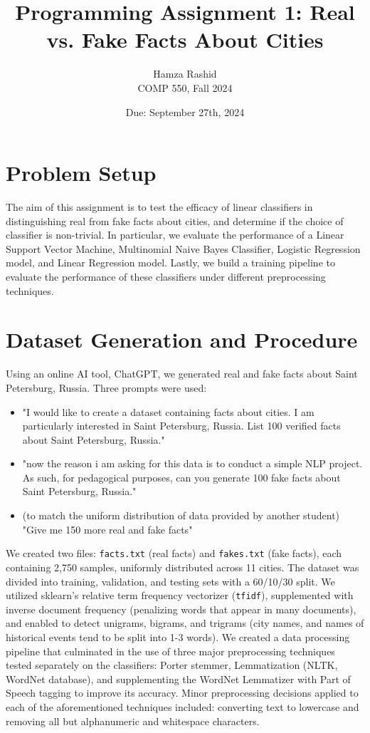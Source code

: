 \documentclass[11pt]{article}
\title{Programming Assignment 1: Real vs. Fake Facts About Cities}
\author{Hamza Rashid \\
COMP 550, Fall 2024}
\date{Due: September 27th, 2024}
\begin{document}
\maketitle

\section{Problem Setup}
The aim of this assignment is to test the efficacy of linear classifiers
in distinguishing real from fake facts about cities, and determine if the choice
of classifier is non-trivial. In particular, we evaluate the performance 
of a Linear Support Vector Machine, Multinomial Naive Bayes Classifier, 
Logistic Regression model, and Linear Regression model. Lastly, we build a training pipeline
to evaluate the performance of these classifiers under different preprocessing 
techniques.


\section{Dataset Generation and Procedure}
Using an online AI tool, ChatGPT, we generated real and fake facts about Saint Petersburg, Russia. Three prompts were used:
\begin{itemize}
    \item "I would like to create a dataset containing facts about cities. 
    I am particularly interested in Saint Petersburg, Russia.
    List 100 verified facts about Saint Petersburg, Russia."
    \item "now the reason i am asking for this data is to conduct a simple NLP project. 
    As such, for pedagogical purposes, can you generate 100 fake facts about Saint Petersburg, Russia."
    \item (to match the uniform distribution of data provided by another student) "Give me 150 more real and fake facts"
\end{itemize}
We created two files: \texttt{facts.txt} (real facts) 
and \texttt{fakes.txt} (fake facts), each containing 2,750 samples, 
uniformly distributed across 11 cities. The dataset was divided into 
training, validation, and testing sets
with a 60/10/30 split. We utilized sklearn's relative term frequency
vectorizer (\texttt{tfidf}), supplemented with inverse document frequency 
(penalizing words that appear in many documents), 
and enabled to detect unigrams, bigrams, and trigrams (city names, and names of historical 
events tend to be split into 1-3 words). We created a data processing pipeline
that culminated in the use of three major preprocessing techniques
tested separately on the classifiers: 
Porter stemmer, 
Lemmatization (NLTK, WordNet database), 
and supplementing the WordNet Lemmatizer 
with Part of Speech tagging 
to improve its accuracy.
Minor preprocessing decisions applied 
to each of the aforementioned techniques
included: converting text to lowercase and
removing all but alphanumeric and whitespace characters.
\end{document}

